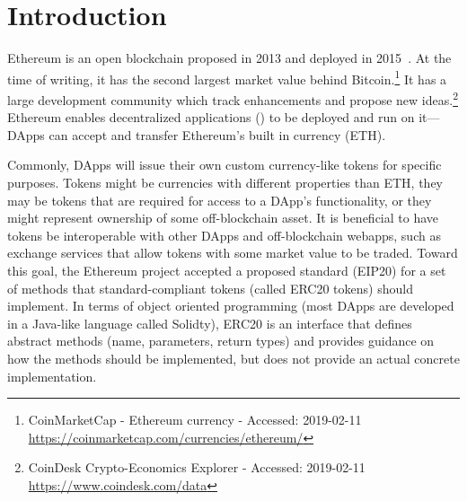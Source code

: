 
\section{Introduction}



Ethereum is an open blockchain proposed in 2013 and deployed in 2015~\cite{Ref00}. At the time of writing, it has the second largest market value behind Bitcoin.\footnote{CoinMarketCap - Ethereum currency - Accessed: 2019-02-11 \newline\url{https://coinmarketcap.com/currencies/ethereum/}} It has a large development community which track enhancements and propose new ideas.\footnote{CoinDesk Crypto-Economics Explorer - Accessed: 2019-02-11 \newline\url{https://www.coindesk.com/data}} Ethereum enables decentralized applications (\dapps) to be deployed and run on it---DApps can accept and transfer Ethereum's built in currency (ETH). 

Commonly, DApps will issue their own custom currency-like tokens for specific purposes. Tokens might be currencies with different properties than ETH, they may be tokens that are required for access to a DApp's functionality, or they might represent ownership of some off-blockchain asset. It is beneficial to have tokens be interoperable with other DApps and off-blockchain webapps, such as exchange services that allow tokens with some market value to be traded. Toward this goal, the Ethereum project accepted a proposed standard (EIP20) for a set of methods that standard-compliant tokens (called ERC20 tokens) should implement. In terms of object oriented programming (most DApps are developed in a Java-like language called Solidty), ERC20 is an interface that defines abstract methods (name, parameters, return types) and provides guidance on how the methods should be implemented, but does not provide an actual concrete implementation. 



